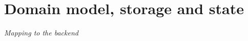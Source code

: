 

\chapter{Domain model, storage and state}
\begin{center}
{\small\em Mapping to the backend}
\end{center}











